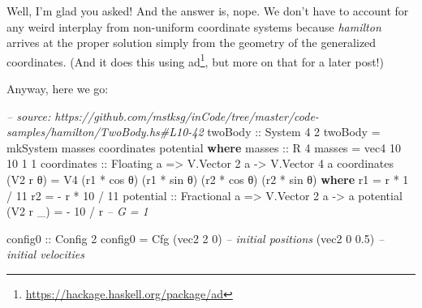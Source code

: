 \documentclass[]{article}
\newenvironment{Shaded}{}{}
\newcommand{\KeywordTok}[1]{\textcolor[rgb]{0.00,0.44,0.13}{\textbf{#1}}}
\newcommand{\DataTypeTok}[1]{\textcolor[rgb]{0.56,0.13,0.00}{#1}}
\newcommand{\DecValTok}[1]{\textcolor[rgb]{0.25,0.63,0.44}{#1}}
\newcommand{\FloatTok}[1]{\textcolor[rgb]{0.25,0.63,0.44}{#1}}
\newcommand{\CommentTok}[1]{\textcolor[rgb]{0.38,0.63,0.69}{\textit{#1}}}
\newcommand{\OtherTok}[1]{\textcolor[rgb]{0.00,0.44,0.13}{#1}}
\newcommand{\FunctionTok}[1]{\textcolor[rgb]{0.02,0.16,0.49}{#1}}
\newcommand{\NormalTok}[1]{#1}
\renewcommand{\href}[2]{#2\footnote{\url{#1}}}
\begin{document}
Well, I'm glad you asked! And the answer is, nope. We don't have to account for
any weird interplay from non-uniform coordinate systems because \emph{hamilton}
arrives at the proper solution simply from the geometry of the generalized
coordinates. (And it does this using
\href{https://hackage.haskell.org/package/ad}{ad}, but more on that for a later
post!)

Anyway, here we go:

\begin{Shaded}
\begin{Highlighting}[]
\CommentTok{-- source: https://github.com/mstksg/inCode/tree/master/code-samples/hamilton/TwoBody.hs#L10-42}
\OtherTok{twoBody ::} \DataTypeTok{System} \DecValTok{4} \DecValTok{2}
\NormalTok{twoBody }\FunctionTok{=}\NormalTok{ mkSystem masses coordinates potential}
  \KeywordTok{where}
\OtherTok{    masses ::} \DataTypeTok{R} \DecValTok{4}
\NormalTok{    masses }\FunctionTok{=}\NormalTok{ vec4 }\DecValTok{10} \DecValTok{10} \DecValTok{1} \DecValTok{1}
\NormalTok{    coordinates}
\OtherTok{        ::} \DataTypeTok{Floating}\NormalTok{ a}
        \OtherTok{=>} \DataTypeTok{V.Vector} \DecValTok{2}\NormalTok{ a}
        \OtherTok{->} \DataTypeTok{V.Vector} \DecValTok{4}\NormalTok{ a}
\NormalTok{    coordinates (}\DataTypeTok{V2}\NormalTok{ r θ) }\FunctionTok{=} \DataTypeTok{V4}\NormalTok{ (r1 }\FunctionTok{*}\NormalTok{ cos θ) (r1 }\FunctionTok{*}\NormalTok{ sin θ)}
\NormalTok{                              (r2 }\FunctionTok{*}\NormalTok{ cos θ) (r2 }\FunctionTok{*}\NormalTok{ sin θ)}
      \KeywordTok{where}
\NormalTok{        r1 }\FunctionTok{=}\NormalTok{   r }\FunctionTok{*}  \DecValTok{1} \FunctionTok{/} \DecValTok{11}
\NormalTok{        r2 }\FunctionTok{=} \FunctionTok{-}\NormalTok{ r }\FunctionTok{*} \DecValTok{10} \FunctionTok{/} \DecValTok{11}
\NormalTok{    potential}
\OtherTok{        ::} \DataTypeTok{Fractional}\NormalTok{ a}
        \OtherTok{=>} \DataTypeTok{V.Vector} \DecValTok{2}\NormalTok{ a}
        \OtherTok{->}\NormalTok{ a}
\NormalTok{    potential (}\DataTypeTok{V2}\NormalTok{ r _) }\FunctionTok{=} \FunctionTok{-} \DecValTok{10} \FunctionTok{/}\NormalTok{ r       }\CommentTok{-- G = 1}

\OtherTok{config0 ::} \DataTypeTok{Config} \DecValTok{2}
\NormalTok{config0 }\FunctionTok{=} \DataTypeTok{Cfg}\NormalTok{ (vec2 }\DecValTok{2}   \DecValTok{0}\NormalTok{)  }\CommentTok{-- initial positions}
\NormalTok{              (vec2 }\DecValTok{0} \FloatTok{0.5}\NormalTok{)  }\CommentTok{-- initial velocities}
\end{Highlighting}
\end{Shaded}
\end{document}
